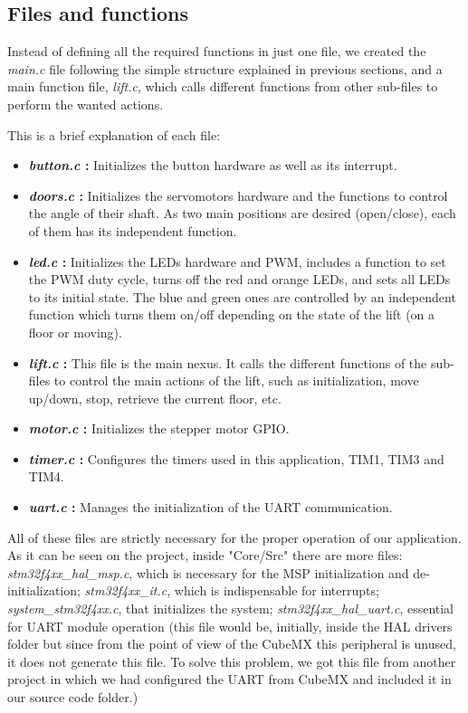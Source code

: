 \subsection{Files and functions}

Instead of defining all the required functions in just one file, we created the \textit{main.c} file following the simple structure explained in previous sections, and a main function file, \textit{lift.c}, which calls different functions from other sub-files to perform the wanted actions.

\medskip

This is a brief explanation of each file:

\begin{itemize}
    \item \textbf{\textit{button.c} :} Initializes the button hardware as well as its interrupt.
    \item \textbf{\textit{doors.c} :} Initializes the servomotors hardware and the functions to control the angle of their shaft. As two main positions are desired (open/close), each of them has its independent function.
    \item \textbf{\textit{led.c} :} Initializes the LEDs hardware and PWM, includes a function to set the PWM duty cycle, turns off the red and orange LEDs, and sets all LEDs to its initial state. The blue and green ones are controlled by an independent function which turns them on/off depending on the state of the lift (on a floor or moving).
    \item \textbf{\textit{lift.c} :} This file is the main nexus. It calls the different functions of the sub-files to control the main actions of the lift, such as initialization, move up/down, stop, retrieve the current floor, etc.
    \item \textbf{\textit{motor.c} :} Initializes the stepper motor GPIO.
    \item \textbf{\textit{timer.c} :} Configures the timers used in this application, TIM1, TIM3 and TIM4.
    \item \textbf{\textit{uart.c} :} Manages the initialization of the UART communication.
\end{itemize}

All of these files are strictly necessary for the proper operation of our application. As it can be seen on the project, inside "Core/Src" there are more files: \textit{stm32f4xx\_hal\_msp.c}, which is necessary for the MSP initialization and de-initialization; \textit{stm32f4xx\_it.c}, which is indispensable for interrupts; \textit{system\_stm32f4xx.c}, that initializes the system; \textit{stm32f4xx\_hal\_uart.c}, essential for UART module operation (this file would be, initially, inside the HAL drivers folder but since from the point of view of the CubeMX this peripheral is unused, it does not generate this file. To solve this problem, we got this file from another project in which we had configured the UART from CubeMX and included it in our source code folder.) 

